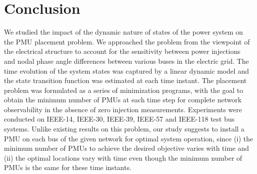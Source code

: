 \documentclass[10pt,journal,twocolumn]{IEEEtran}\IEEEoverridecommandlockouts
\begin{document}
\section{Conclusion}\label{sec:conclusion}
We studied the impact of the dynamic nature of states of the power system on the PMU placement problem. We approached the problem from the viewpoint of the electrical structure to account for the sensitivity between power injections and nodal phase angle differences between various buses in the electric grid. The time evolution of the system states was captured by a linear dynamic model and the state transition function was estimated at each time instant. The placement problem was formulated as a series of minimization programs, with the goal to obtain the minimum number of PMUs at each time step for complete network observability in the absence of zero injection measurements. Experiments were conducted on IEEE-14, IEEE-30, IEEE-39, IEEE-57 and IEEE-118 test bus systems. Unlike existing results on this problem, our study suggests to install a PMU on each bus of the given network for optimal system operation, since (i) the minimum number of PMUs to achieve the desired objective varies with time and (ii) the optimal locations vary with time even though the minimum number of PMUs is the same for these time instants.





\raggedbottom
\end{document}
